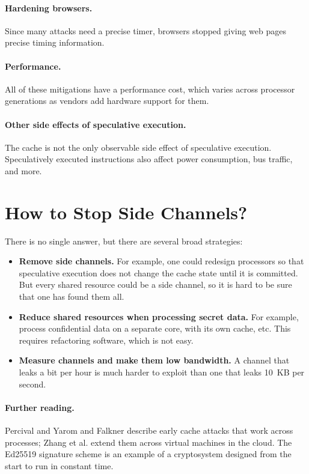 \paragraph{Hardening browsers.}
Since many attacks need a precise timer, browsers stopped giving web
pages precise timing information.

\paragraph{Performance.}
All of these mitigations have a performance cost, which varies across
processor generations as vendors add hardware support for them.\autocite{behrens:mitigations}

\paragraph{Other side effects of speculative execution.}
The cache is not the only observable side effect of speculative
execution.
Speculatively executed instructions also affect power consumption, bus
traffic, and more.

\section{How to Stop Side Channels?}

There is no single answer, but there are several broad strategies:
\begin{itemize}
  \item \textbf{Remove side channels.}
        For example, one could redesign processors so that speculative
        execution does not change the cache state until it is committed.
        But every shared resource could be a side channel, so it is hard
        to be sure that one has found them all.
  \item \textbf{Reduce shared resources when processing secret data.}
        For example, process confidential data on a separate core, with
        its own cache, etc.
        This requires refactoring software, which is not easy.
  \item \textbf{Measure channels and make them low bandwidth.}
        A channel that leaks a bit per hour is much harder to exploit
        than one that leaks 10~KB per second.
\end{itemize}

\paragraph{Further reading.}
Percival\autocite{percival:cache} and Yarom and
Falkner\autocite{yarom:flush-reload} describe early cache attacks that
work across processes;
Zhang et al.\autocite{zhang:cross-vm} extend them across virtual machines in
the cloud.
The Ed25519 signature scheme\autocite{bernstein:ed25519} is an example of a
cryptosystem designed from the start to run in constant time.
